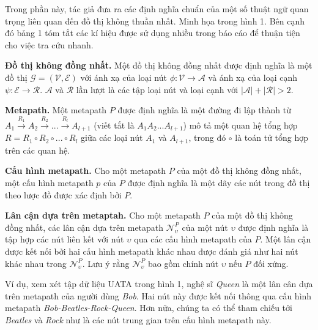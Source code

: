 Trong phần này, tác giả đưa ra các định nghĩa chuẩn của một số thuật ngữ quan trọng liên quan đến đồ thị không thuần nhất. Minh họa trong hình 1. Bên cạnh đó bảng 1 tóm tắt các kí hiệu được sử dụng nhiều trong báo cáo để thuận tiện cho việc tra cứu nhanh.

\begin{definition}
\textbf{Đồ thị không đồng nhất.} Một đồ thị không đồng nhất được định nghĩa là một đồ thị $\pmb{\mathcal{G}} = (\pmb{\mathcal{V}}, \pmb{\mathcal{E}})$ với ánh xạ của loại nút $\phi: \pmb{\mathcal{V}} \to \pmb{\mathcal{A}}$ và ánh xạ của loại cạnh $\psi: \pmb{\mathcal{E}} \to \pmb{\mathcal{R}}$. $\pmb{\mathcal{A}}$ và $\pmb{\mathcal{R}}$ lần lượt là các tập loại nút và loại cạnh với $|\pmb{\mathcal{A}}| + |\pmb{\mathcal{R}}| > 2$.
\end{definition}

\begin{definition}
  \textbf{Metapath.} Một metapath $P$ được định nghĩa là một đường đi lập thành từ $A_1  \xrightarrow{R_1} A_2  \xrightarrow{R_2} ... \xrightarrow{R_l} A_{l+1}$ (viết tắt là $A_1 A_2 ... A_{l+1}$) mô tả một quan hệ tổng hợp $R = R_1 \circ R_2 \circ ... \circ R_l$ giữa các loại nút $A_1$ và $A_{l+1}$, trong đó $\circ$ là toán tử tổng hợp trên các quan hệ.
\end{definition}

\begin{definition}
  \textbf{Cấu hình metapath.} Cho một metapath $P$ của một đồ thị không đồng nhất, một cấu hình metapath $p$ của $P$ được định nghĩa là một dãy các nút trong đồ thị theo lược đồ được xác định bởi $P$.
\end{definition}

\begin{definition}
  \textbf{Lân cận dựa trên metaptah.} Cho một metapath $P$ của một đồ thị không đồng nhất, các lân cận dựa trên metapath $\pmb{\mathcal{N}}_\upsilon ^ P$ của một nút $\upsilon$ được định nghĩa là tập hợp các nút liên kết với nút $\upsilon$ qua các cấu hình metapath của $P$. Một lân cận được kết nối bởi hai cấu hình metapath khác nhau được đánh giá như hai nút khác nhau trong $\pmb{\mathcal{N}}_\upsilon ^ P$. Lưu ý rằng $\pmb{\mathcal{N}}_\upsilon ^ P$ bao gồm chính nút $\upsilon$ nếu $P$ đối xứng.

  Ví dụ, xem xét tập dữ liệu UATA trong hình 1, nghệ sĩ \textit{Queen} là một lân cân dựa trên metapath của người dùng \textit{Bob}. Hai nút này được kết nối thông qua cấu hình metapath \textit{Bob-Beatles-Rock-Queen}. Hơn nữa, chúng ta có thể tham chiếu tới \textit{Beatles} và \textit{Rock} như là các nút trung gian trên cấu hình metapath này.
\end{definition}

